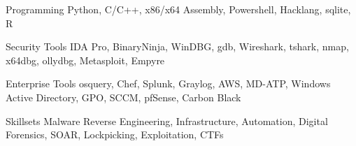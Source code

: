 


\begin{cvskills}


\cvskill
{Programming} %
{Python, C/C++, x86/x64 Assembly, Powershell, Hacklang, sqlite, R} %


\cvskill
{Security Tools} %
{IDA Pro, BinaryNinja, WinDBG, gdb, Wireshark, tshark, nmap, x64dbg, ollydbg, Metasploit, Empyre} %


\cvskill
{Enterprise Tools} %
{osquery, Chef, Splunk, Graylog, AWS, MD-ATP, Windows Active Directory, GPO, SCCM, pfSense, Carbon Black} %


\cvskill
{Skillsets} %
{Malware Reverse Engineering, Infrastructure, Automation, Digital Forensics, SOAR, Lockpicking, Exploitation, CTFs} %


\end{cvskills}
